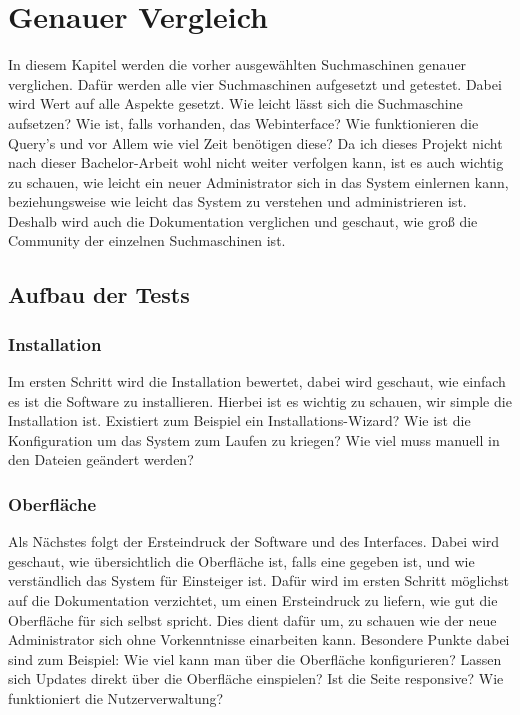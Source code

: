 \chapter{Genauer Vergleich}

In diesem Kapitel werden die vorher ausgewählten Suchmaschinen genauer verglichen. Dafür werden alle vier Suchmaschinen aufgesetzt und getestet. Dabei wird Wert auf alle Aspekte gesetzt. Wie leicht lässt sich die Suchmaschine aufsetzen? Wie ist, falls vorhanden, das Webinterface? Wie funktionieren die Query’s und vor Allem wie viel Zeit benötigen diese? Da ich dieses Projekt nicht nach dieser Bachelor-Arbeit wohl nicht weiter verfolgen kann, ist es auch wichtig zu schauen, wie leicht ein neuer Administrator sich in das System einlernen kann, beziehungsweise wie leicht das System zu verstehen und administrieren ist. Deshalb wird auch die Dokumentation verglichen und geschaut, wie groß die Community der einzelnen Suchmaschinen ist. 

\section{Aufbau der Tests}

\subsection{Installation}

Im ersten Schritt wird die Installation bewertet, dabei wird geschaut, wie einfach es ist die Software zu installieren. Hierbei ist es wichtig zu schauen, wir simple die Installation ist. Existiert zum Beispiel ein Installations-Wizard? Wie ist die Konfiguration um das System zum Laufen zu kriegen? Wie viel muss manuell in den Dateien geändert werden?

\subsection{Oberfläche}

Als Nächstes folgt der Ersteindruck der Software und des Interfaces. Dabei wird geschaut, wie übersichtlich die Oberfläche ist, falls eine gegeben ist, und wie verständlich das System für Einsteiger ist. Dafür wird im ersten Schritt möglichst auf die Dokumentation verzichtet, um einen Ersteindruck zu liefern, wie gut die Oberfläche für sich selbst spricht. Dies dient dafür um, zu schauen wie der neue Administrator sich ohne Vorkenntnisse einarbeiten kann. Besondere Punkte dabei sind zum Beispiel: Wie viel kann man über die Oberfläche konfigurieren? Lassen sich Updates direkt über die Oberfläche einspielen? Ist die Seite responsive? Wie funktioniert die Nutzerverwaltung?

